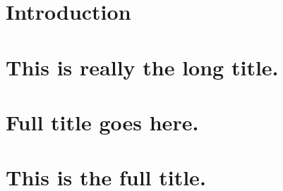    \chapter{Introduction}
   \label{ch:IntroductionLabel}
   

   \chapter[%
      Whatever you call it in the contents
   ]{%
      This is really the long title. 
   }%
   \label{ch:streamflow}
   
  
  \chapter[%
      title in the contents
   ]{%
      Full title goes here. 
   }%
   \label{ch:snowpack}
   
  
  \chapter[%
      this can be short title
   ]{%
      This is the full title.  
   }%
   \label{ch:snowpack}
   
   
   \backmatter
   
   

   
   
